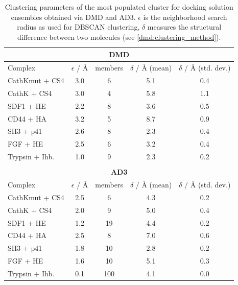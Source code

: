 \begin{table}
\tiny
\centering
\renewcommand{\arraystretch}{1.3}
\begin{tabular}{@{}lcccc@{}}
\multicolumn{5}{c}{\textbf{DMD}} \\
\midrule
Complex & $\epsilon$ / \si{\angstrom} & members & $\delta$ / \si{\angstrom} (mean) &  $\delta$ / \si{\angstrom} (std. dev.) \\
\midrule
CathKmut + CS4 & 3.0 & 6   & 5.1 & 0.4 \\
CathK + CS4    & 3.0 & 4   & 5.8 & 1.1 \\
SDF1 + HE      & 2.2 & 8   & 3.6 & 0.5 \\
CD44 + HA      & 3.2 & 5   & 8.7 & 0.9 \\
SH3 + p41      & 2.6 & 8   & 2.3 & 0.4 \\
FGF + HE       & 2.5 & 6   & 3.2 & 0.4 \\
Trypsin + Ihb. & 1.0 & 9   & 2.3 & 0.2 \\
\midrule
& & & & \\
\multicolumn{5}{c}{\textbf{AD3}} \\
\midrule
Complex & $\epsilon$ / \si{\angstrom} & members & $\delta$ / \si{\angstrom} (mean) &  $\delta$ / \si{\angstrom} (std. dev.) \\
\midrule
CathKmut + CS4  & 2.5 & 6   & 4.3 & 0.2 \\
CathK + CS4     & 2.0 & 9   & 5.0 & 0.4 \\
SDF1 + HE       & 1.2 & 19  & 4.4 & 0.2 \\
CD44 + HA       & 2.5 & 8   & 7.0 & 0.6 \\
SH3 + p41       & 1.8 & 10  & 2.8 & 0.2 \\
FGF + HE        & 1.6 & 10  & 5.1 & 0.3 \\
Trypsin + Ihb.  & 0.1 & 100 & 4.1 & 0.0 \\
\midrule
\end{tabular}
\caption{
Clustering parameters of the most populated cluster for docking solution
ensembles obtained via DMD and AD3. $\epsilon$ is the neighborhood search radius
as used for DBSCAN clustering, $\delta$ measures the structural difference
between two molecules (see \cref{dmd:clustering_method}).
}
\label{tab:dmd:clustering_parameters}
\end{table}


